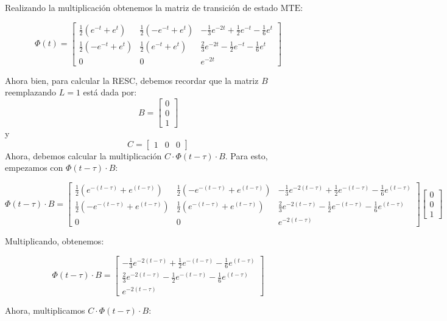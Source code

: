 \begin{enumerate}
Realizando la multiplicación obtenemos la matriz de transición de estado \( \text{MTE} \):

\[
\Phi(t) =
\begin{bmatrix}
\frac{1}{2} (e^{-t} + e^{t}) & \frac{1}{2} (-e^{-t} + e^{t}) & -\frac{1}{3}e^{-2t}+\frac{1}{2}e^{-t}-\frac{1}{6} e^{t} \\
\frac{1}{2} (-e^{-t} + e^{t}) & \frac{1}{2} (e^{-t} + e^{t}) &\frac{2}{3}e^{-2t}-\frac{1}{2}e^{-t}-\frac{1}{6} e^{t} \\
0 & 0 & e^{-2t} 
\end{bmatrix}
\]

Ahora bien, para calcular la RESC, debemos recordar que la matriz $B$ reemplazando $L=1$ está dada por:
\[
B=
\begin{bmatrix}
0 \\
0 \\
1
\end{bmatrix}
\]
y
\[
C = \begin{bmatrix} 1 & 0 & 0 \end{bmatrix}
\]
Ahora, debemos calcular la multiplicación \( C \cdot \Phi(t - \tau) \cdot B \). Para esto, empezamos con \( \Phi(t - \tau) \cdot B \):

\[
\Phi(t - \tau) \cdot B =
\begin{bmatrix}
\frac{1}{2} (e^{-(t-\tau)} + e^{(t-\tau)}) & \frac{1}{2} (-e^{-(t-\tau)} + e^{(t-\tau)}) & -\frac{1}{3}e^{-2(t-\tau)}+\frac{1}{2}e^{-(t-\tau)}-\frac{1}{6} e^{(t-\tau)} \\
\frac{1}{2} (-e^{-(t-\tau)} + e^{(t-\tau)}) & \frac{1}{2} (e^{-(t-\tau)} + e^{(t-\tau)}) & \frac{2}{3}e^{-2(t-\tau)}-\frac{1}{2}e^{-(t-\tau)}-\frac{1}{6} e^{(t-\tau)} \\
0 & 0 & e^{-2(t-\tau)}
\end{bmatrix}
\begin{bmatrix}
0 \\
0 \\
1
\end{bmatrix}
\]

Multiplicando, obtenemos:

\[
\Phi(t - \tau) \cdot B =
\begin{bmatrix}
-\frac{1}{3}e^{-2(t-\tau)} + \frac{1}{2}e^{-(t-\tau)} - \frac{1}{6}e^{(t-\tau)} \\
\frac{2}{3}e^{-2(t-\tau)} - \frac{1}{2}e^{-(t-\tau)} - \frac{1}{6}e^{(t-\tau)} \\
e^{-2(t-\tau)}
\end{bmatrix}
\]

Ahora, multiplicamos \( C \cdot \Phi(t - \tau) \cdot B \):


\end{enumerate}

